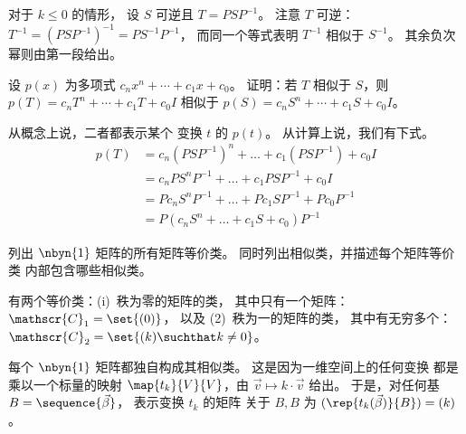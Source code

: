 \begin{exercises}
\begin{answer}
       对于 $k\leq 0$ 的情形， 
       设 \( S \) 可逆且 \( T=PSP^{-1} \)。
       注意 \( T \) 可逆：
       \( T^{-1}=(PSP^{-1})^{-1}=PS^{-1}P^{-1} \)，
       而同一个等式表明 
       \( T^{-1} \) 相似于 \( S^{-1} \)。
       其余负次幂则由第一段给出。  
     \end{answer}
  \recommended \item
     设 \( p(x) \) 为多项式 \( c_nx^n+\cdots+c_1x+c_0 \)。
     证明：若 \( T \) 相似于 \( S \)，则
     \( p(T)=c_nT^n+\cdots+c_1T+c_0I \) 相似于
     \( p(S)=c_nS^n+\cdots+c_1S+c_0I \)。
     \begin{answer}
        从概念上说，二者都表示某个
        变换 \( t \) 的 \( p(t) \)。
        从计算上说，我们有下式。
        \begin{align*}
           p(T)
           &=c_n(PSP^{-1})^n+\dots+c_1(PSP^{-1})+c_0I   \\
           &=c_nPS^nP^{-1}+\dots+c_1PSP^{-1}+c_0I   \\
           &=Pc_nS^nP^{-1}+\dots+Pc_1SP^{-1}+Pc_0P^{-1}   \\
           &=P(c_nS^n+\dots+c_1S+c_0)P^{-1}
        \end{align*}  
      \end{answer}
  \item 
     列出 \( \nbyn{1} \) 矩阵的所有矩阵等价类。
     同时列出相似类，并描述每个矩阵等价类
     内部包含哪些相似类。
     \begin{answer}
       有两个等价类：(i)~秩为零的矩阵的类， 
       其中只有一个矩阵：
       $\mathscr{C}_1=\set{(0)}$，
       以及 (2)~秩为一的矩阵的类，
       其中有无穷多个： 
       \( \mathscr{C}_2=\set{(k)\suchthat k\neq0} \)。

      每个 \( \nbyn{1} \) 矩阵都独自构成其相似类。
      这是因为一维空间上的任何变换
      都是乘以一个标量的映射 $\map{t_k}{V}{V}$，由
      $\vec{v}\mapsto k\cdot\vec{v}$ 给出。 
      于是，对任何基 \( B=\sequence{\vec{\beta}} \)，
      表示变换 \( t_k \) 的矩阵 
      关于 \( B,B \) 为
      \( (\rep{t_k(\vec{\beta})}{B})=(k) \)。 
      

\end{answer}
\end{exercises}
